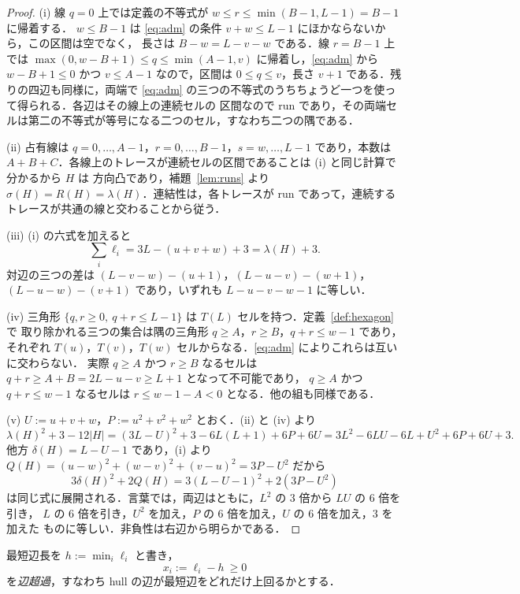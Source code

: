 \documentclass[11pt]{article}
\theoremstyle{plain}
\theoremstyle{definition}
\theoremstyle{remark}
\begin{document}
\begin{proof}
(i) 線 \(q=0\) 上では定義の不等式が \(w\le r\le\min(B-1,L-1)=B-1\) に帰着する．
\(w\le B-1\) は \eqref{eq:adm} の条件 \(v+w\le L-1\) にほかならないから，この区間は空でなく，
長さは \(B-w=L-v-w\) である．線 \(r=B-1\) 上では
\(\max(0,w-B+1)\le q\le\min(A-1,v)\) に帰着し，\eqref{eq:adm} から \(w-B+1\le0\) かつ
\(v\le A-1\) なので，区間は \(0\le q\le v\)，長さ \(v+1\) である．残りの四辺も同様に，両端で
\eqref{eq:adm} の三つの不等式のうちちょうど一つを使って得られる．各辺はその線上の連続セルの
区間なので run であり，その両端セルは第二の不等式が等号になる二つのセル，すなわち二つの隅である．

(ii) 占有線は \(q=0,\dots,A-1\)，\(r=0,\dots,B-1\)，\(s=w,\dots,L-1\) であり，本数は
\(A+B+C\)．各線上のトレースが連続セルの区間であることは (i) と同じ計算で分かるから \(H\) は
方向凸であり，補題~\ref{lem:runs} より \(\sigma(H)=R(H)=\lambda(H)\)．連結性は，各トレースが
run であって，連続するトレースが共通の線と交わることから従う．

(iii) (i) の六式を加えると
\[
   \sum_{i}\ell_{i}=3L-(u+v+w)+3=\lambda(H)+3 .
\]
対辺の三つの差は \((L-v-w)-(u+1)\)，\((L-u-v)-(w+1)\)，\((L-u-w)-(v+1)\) であり，いずれも
\(L-u-v-w-1\) に等しい．

(iv) 三角形 \(\{q,r\ge0,\ q+r\le L-1\}\) は \(T(L)\) セルを持つ．定義~\ref{def:hexagon} で
取り除かれる三つの集合は隅の三角形 \(q\ge A\)，\(r\ge B\)，\(q+r\le w-1\) であり，それぞれ
\(T(u)\)，\(T(v)\)，\(T(w)\) セルからなる．\eqref{eq:adm} によりこれらは互いに交わらない．
実際 \(q\ge A\) かつ \(r\ge B\) なるセルは \(q+r\ge A+B=2L-u-v\ge L+1\) となって不可能であり，
\(q\ge A\) かつ \(q+r\le w-1\) なるセルは \(r\le w-1-A<0\) となる．他の組も同様である．

(v) \(U:=u+v+w\)，\(P:=u^{2}+v^{2}+w^{2}\) とおく．(ii) と (iv) より
\[
   \lambda(H)^{2}+3-12|H|=(3L-U)^{2}+3-6L(L+1)+6P+6U
   =3L^{2}-6LU-6L+U^{2}+6P+6U+3 .
\]
他方 \(\delta(H)=L-U-1\) であり，(i) より
\(Q(H)=(u-w)^{2}+(w-v)^{2}+(v-u)^{2}=3P-U^{2}\) だから
\[
   3\delta(H)^{2}+2Q(H)=3(L-U-1)^{2}+2(3P-U^{2})
\]
は同じ式に展開される．言葉では，両辺はともに，\(L^{2}\) の 3 倍から \(LU\) の 6 倍を引き，
\(L\) の 6 倍を引き，\(U^{2}\) を加え，\(P\) の 6 倍を加え，\(U\) の 6 倍を加え，3 を加えた
ものに等しい．非負性は右辺から明らかである．
\end{proof}


最短辺長を \(h:=\min_{i}\ell_{i}\) と書き，
\[
   x_{i}:=\ell_{i}-h\ \ge0
\]
を\emph{辺超過}，すなわち hull の辺が最短辺をどれだけ上回るかとする．
\end{document}
